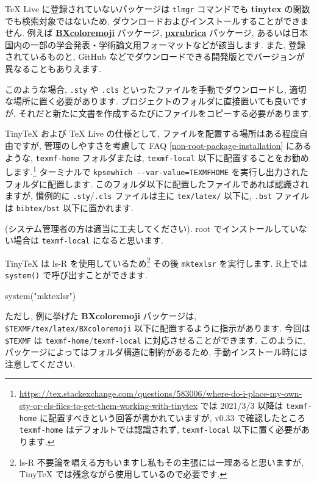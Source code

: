 \documentclass[
  xelatex,ja=standard,jafont=noto]{bxjsreport}
\newenvironment{Shaded}{\begin{snugshade}}{\end{snugshade}}
\newcommand{\FunctionTok}[1]{\textcolor[rgb]{0.00,0.00,0.00}{#1}}
\newcommand{\NormalTok}[1]{#1}
\newcommand{\StringTok}[1]{\textcolor[rgb]{0.31,0.60,0.02}{#1}}
\begin{document}
TeX Live に登録されていないパッケージは \texttt{tlmgr} コマンドでも
\textbf{tinytex} の関数でも検索対象ではないため,
ダウンロードおよびインストールすることができません. 例えば
\href{https://github.com/zr-tex8r/BXcoloremoji}{\textbf{BXcoloremoji}}
パッケージ,
\href{https://github.com/zr-tex8r/PXrubrica}{\textbf{pxrubrica}}
パッケージ,
あるいは日本国内の一部の学会発表・学術論文用フォーマットなどが該当します.
また, 登録されているものと, GitHub
などでダウンロードできる開発版とでバージョンが異なることもありえます.

このような場合, \texttt{.sty} や \texttt{.cls}
といったファイルを手動でダウンロードし, 適切な場所に置く必要があります.
プロジェクトのフォルダに直接置いても良いですが,
それだと新たに文書を作成するたびにファイルをコピーする必要があります.

TinyTeX および TeX Live の仕様として,
ファイルを配置する場所はある程度自由ですが, 管理のしやすさを考慮して FAQ
\ref{non-root-package-installation} にあるような, \texttt{texmf-home}
フォルダまたは, \texttt{texmf-local}
以下に配置することをお勧めします.\footnote{\url{https://tex.stackexchange.com/questions/583006/where-do-i-place-my-own-sty-or-cls-files-to-get-them-working-with-tinytex}
  では 2021/3/3 以降は \texttt{texmf-home}
  に配置すべきという回答が書かれていますが, v0.33 で確認したところ
  \texttt{texmf-home} はデフォルトでは認識されず, \texttt{texmf-local}
  以下に置く必要があります.} ターミナルで
\texttt{kpsewhich\ -\/-var-value=TEXMFHOME}
を実行し出力されたフォルダに配置します.
このフォルダ以下に配置したファイルであれば認識されますが, 慣例的に
\texttt{.sty}/\texttt{.cls} ファイルは主に \texttt{tex/latex/} 以下に,
\texttt{.bst} ファイルは \texttt{bibtex/bst} 以下に置かれます.

(システム管理者の方は適当に工夫してください). root
でインストールしていない場合は \texttt{texmf-local} になると思います.

TinyTeX は ls-R を使用しているため\footnote{ls-R
  不要論を唱える方もいますし私もその主張には一理あると思いますが,
  TinyTeX では残念ながら使用しているので必要です.} その後
\texttt{mktexlsr} を実行します. R上では \texttt{system()}
で呼び出すことができます.

\begin{Shaded}
\begin{Highlighting}[numbers=left,,]
\FunctionTok{system}\NormalTok{(}\StringTok{"mktexlsr"}\NormalTok{)}
\end{Highlighting}
\end{Shaded}

ただし, 例に挙げた \textbf{BXcoloremoji} パッケージは,
\texttt{\$TEXMF/tex/latex/BXcoloremoji}
以下に配置するように指示があります. 今回は \texttt{\$TEXMF} は
\texttt{texmf-home}/\texttt{texmf-local} に対応させることができます.
このように, パッケージによってはフォルダ構造に制約があるため,
手動インストール時には注意してください.
\end{document}
